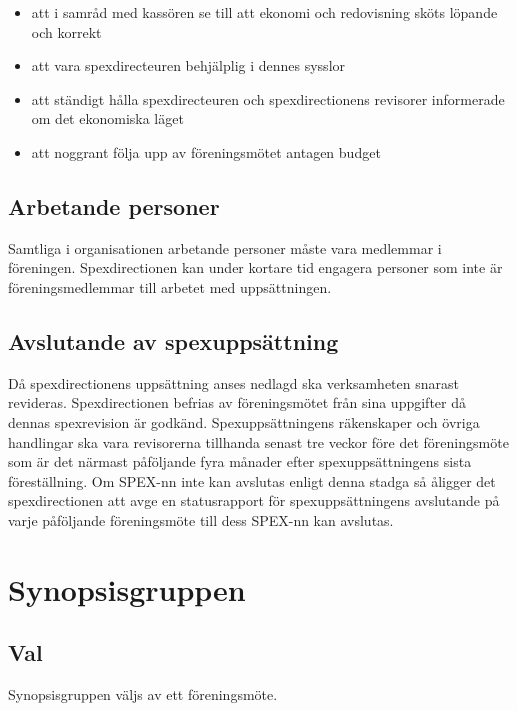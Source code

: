 \documentclass[a4paper]{article}
\begin{document}
\begin{itemize}
  \item att i samråd med kassören se till att ekonomi och redovisning sköts löpande och korrekt
  \item att vara spexdirecteuren behjälplig i dennes sysslor
  \item att ständigt hålla spexdirecteuren och spexdirectionens revisorer informerade om det ekonomiska läget
  \item att noggrant följa upp av föreningsmötet antagen budget
\end{itemize}

\subsection{Arbetande personer}
Samtliga i organisationen arbetande personer måste vara medlemmar i föreningen. Spexdirectionen kan under kortare tid engagera personer som inte är föreningsmedlemmar till arbetet med uppsättningen.

\subsection{Avslutande av spexuppsättning}
Då spexdirectionens uppsättning anses nedlagd ska verksamheten snarast revideras. Spexdirectionen befrias av föreningsmötet från sina uppgifter då dennas spexrevision är godkänd.\newline
\newline
Spexuppsättningens räkenskaper och övriga handlingar ska vara revisorerna tillhanda senast tre veckor före det föreningsmöte som är det närmast påföljande fyra månader efter spexuppsättningens sista föreställning.\newline
\newline
Om SPEX-nn inte kan avslutas enligt denna stadga så åligger det spexdirectionen att avge en statusrapport för spexuppsättningens avslutande på varje påföljande föreningsmöte till dess SPEX-nn kan avslutas.

\section{Synopsisgruppen}
\label{section:synopsisgruppen}

\subsection{Val}
Synopsisgruppen väljs av ett föreningsmöte.
\end{document}
